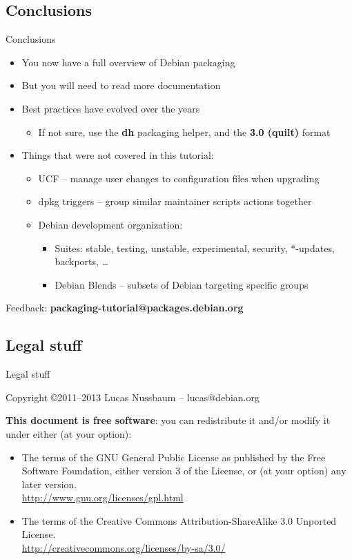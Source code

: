 \documentclass[10pt,final]{beamer}
\begin{document}
\subsection{Conclusions}
\begin{frame}{Conclusions}
  \begin{itemize}
  \item You now have a full overview of Debian packaging
    \br
  \item But you will need to read more documentation
    \br
  \item Best practices have evolved over the years
    \begin{itemize}
    \item If not sure, use the \textbf{dh} packaging helper, and the \textbf{3.0 (quilt)} format
    \end{itemize}
    \br
  \item Things that were not covered in this tutorial:
    \begin{itemize}
	\item UCF -- manage user changes to configuration files when upgrading
		\hbr
	\item dpkg triggers -- group similar maintainer scripts actions together
		\hbr
	\item Debian development organization:
		\begin{itemize}
			\item Suites: stable, testing, unstable, experimental, security, *-updates, backports, \ldots
			\item Debian Blends -- subsets of Debian targeting specific groups
		\end{itemize}
		\end{itemize}
  \end{itemize}
  \vfill
  \centerline{\large Feedback: \textbf{packaging-tutorial@packages.debian.org}}
\end{frame}

\subsection{Legal stuff}
\begin{frame}{Legal stuff}

  Copyright \copyright 2011--2013 Lucas Nussbaum -- lucas@debian.org
  \br

  {\small 
    \textbf{This document is free software}: you can redistribute it and/or modify
    it under either (at your option):
    \hbr
    \begin{itemize}
    \item The terms of the GNU General Public License as published by the Free
      Software Foundation, either version 3 of the License, or
      (at your option) any later version.\\
      \url{http://www.gnu.org/licenses/gpl.html} \br
    \item The terms of the Creative Commons Attribution-ShareAlike 3.0 Unported
      License.\\ 
      \url{http://creativecommons.org/licenses/by-sa/3.0/}
    \end{itemize}
  }
\end{frame}
\end{document}
